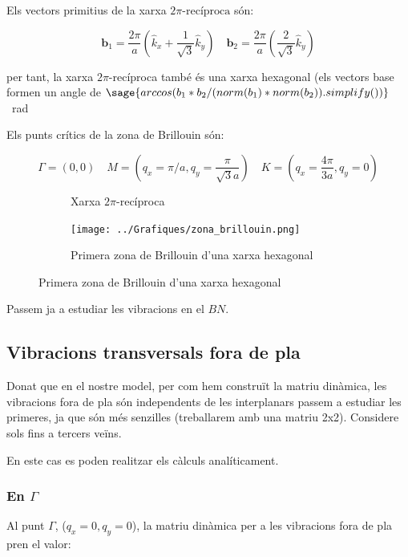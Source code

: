 \documentclass[12pt]{article} %
\let\vec\mathbf %
\begin{document}
Els vectors primitius de la xarxa $2\pi\text{-recíproca}$ són:

\begin{equation}
\label{eq:11}
\vec b_1=\frac{2\pi}{a}\left(\hat k_{x}+\frac{1}{\sqrt{3}}\hat k_{y}\right)\quad \vec b_2=\frac{2\pi}{a}\left(\frac{2}{\sqrt{3}}\hat k_y\right)
\end{equation} 

per tant, la xarxa $2\pi$-recíproca també és una xarxa hexagonal (els vectors base formen un angle de $\sage{arccos(b_1*b_2/(norm(b_1)*norm(b_2)).simplify())}$ \SI{}{\radian}

Els punts crítics de la zona de Brillouin són:

\begin{equation}
 \label{puntsbrillouin}
 \Gamma=(0,0)\quad M=\left(q_x=\pi/a,q_y=\frac{\pi}{\sqrt{3} a}\right)\quad K=\left(q_x=\frac{4\pi}{3 a}, q_y=0\right)
\end{equation}

\begin{figure}[h]
\centering
\begin{subfigure}[b]{0.4\textwidth}
\centering
{}
\caption{Xarxa $2\pi$-recíproca}
\end{subfigure}
\begin{subfigure}[b]{0.4\textwidth}
\centering
\texttt{[image: ../Grafiques/zona\_brillouin.png]}
\caption{Primera zona de Brillouin d'una xarxa hexagonal}
\end{subfigure}
\end{figure}



Passem ja a estudiar les vibracions en el $BN$.
\subsection{Vibracions transversals fora de pla}
Donat que en el nostre model, per com hem construït la matriu dinàmica, les vibracions fora de pla són independents de les interplanars passem a estudiar les primeres, ja que són més senzilles (treballarem amb una matriu 2x2). Considere sols fins a tercers veïns.

En este cas es poden realitzar els càlculs analíticament.

\subsubsection{En $\Gamma$}
Al punt $\Gamma$, ($q_x=0, q_y=0$), la matriu dinàmica  per a les vibracions fora de pla pren el valor:
\end{document}

